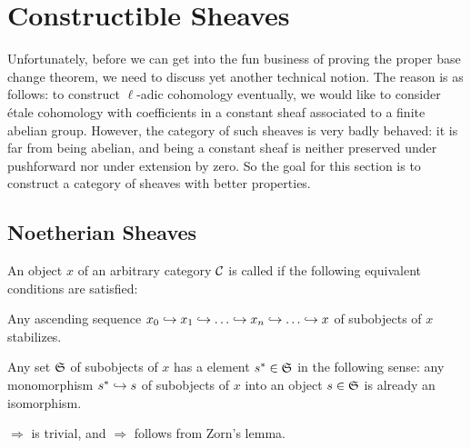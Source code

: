 \section{Constructible Sheaves}
Unfortunately, before we can get into the fun business of proving the proper base change theorem, we need to discuss yet another technical notion. The reason is as follows: to construct $\ell$-adic cohomology eventually, we would like to consider étale cohomology with coefficients in a constant sheaf associated to a finite abelian group. However, the category of such sheaves is very badly behaved: it is far from being abelian, and being a constant sheaf is neither preserved under pushforward nor under extension by zero. So the goal for this section is to construct a category of sheaves with better properties.
\subsection{Noetherian Sheaves}
\begin{deflem}\label{def:noetherian}
	An object $x$ of an arbitrary category $\mathcal{C}$ is called  if the following equivalent %
	 conditions are satisfied:
	\begin{alphanumerate}
		\item Any ascending sequence $x_0\monomorphism x_1\monomorphism \dotso\monomorphism x_n\monomorphism \dotso\monomorphism x$ of subobjects of $x$ stabilizes.
		\item Any set $\mathfrak{S}$ of subobjects of $x$ has a  element $s^*\in \mathfrak{S}$ in the following sense: any monomorphism $s^*\monomorphism s$ of subobjects of $x$ into an object $s\in \mathfrak{S}$ is already an isomorphism.
	\end{alphanumerate}
\end{deflem}
\begin{proof*}
	 $\Rightarrow$  is trivial, and  $\Rightarrow$  follows from Zorn's lemma.
\end{proof*}
